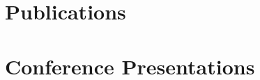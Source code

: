 \documentclass[a4paper]{cv-friggeri}
\begin{document}

\section{Publications}

\cite{salemsetspaper}
\cite{mscthesis}
\cite{largesetsroughpatterns}
\cite{notesfromthemargin}








\newpage


\section{Conference Presentations}
\end{document}
